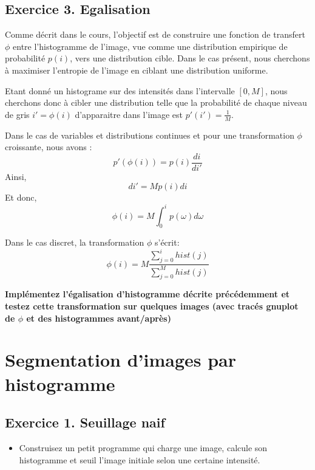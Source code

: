 \documentclass[a4paper, 11pt, french]{article}
\begin{document}
\subsection*{\bf Exercice 3. \rm Egalisation}

Comme décrit dans le cours, l'objectif est de construire une fonction de transfert $\phi$ entre l'histogramme de l'image, vue comme une distribution empirique de probabilité $p(i)$, vers une distribution cible. Dans le cas présent, nous cherchons à maximiser l'entropie de l'image en ciblant une distribution uniforme. 

Etant donné un histograme sur des intensités dans l'intervalle $[0,M]$, nous cherchons donc à cibler une distribution telle que la probabilité de chaque niveau de gris $i'=\phi(i)$ d'apparaitre dans l'image est $p'(i')=\frac{1}{M}$.

Dans le cas de variables et distributions continues et pour une transformation $\phi$ croissante, nous avons :
\begin{equation}
  p'(\phi(i)) = p(i)\frac{di}{di'}
\end{equation}
Ainsi, 
\begin{equation}
  di' = Mp(i) di
\end{equation}
Et donc,
\begin{equation}
  \phi(i) =  M \int_0^i p(\omega)d\omega
\end{equation}

Dans le cas discret, la transformation $\phi$ s'écrit:
\begin{equation}
  \phi(i) = M\frac{\sum_{j=0}^{i} hist(j)}{\sum_{j=0}^M hist(j)}
\end{equation}

{\bf Implémentez l'égalisation d'histogramme décrite précédemment et testez cette transformation sur quelques images (avec tracés gnuplot de $\phi$ et des histogrammes avant/après)}


\section*{\bf Segmentation d'images par histogramme}

\subsection*{\bf Exercice 1. \rm Seuillage naif}

\begin{itemize}
	\item Construisez un petit programme qui charge une image, calcule son histogramme et seuil l'image initiale selon une certaine intensité.
\end{itemize}
\end{document}
